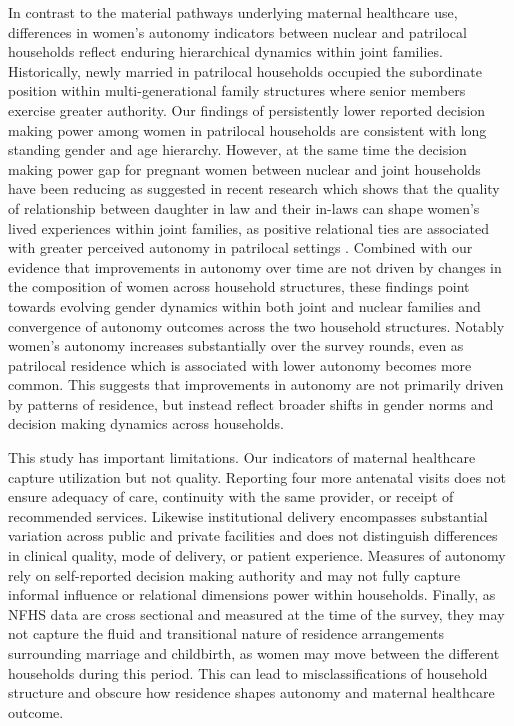 \documentclass[12pt]{article}
\begin{document}
In contrast to the material pathways underlying maternal healthcare use, differences in women’s autonomy indicators between nuclear and patrilocal households reflect enduring hierarchical dynamics within joint families. Historically, newly married in patrilocal households occupied the subordinate position within multi-generational family structures where senior members exercise greater authority. Our findings of persistently lower reported decision making power among women in patrilocal households are consistent with long standing gender and age hierarchy. However, at the same time the decision making power gap for pregnant women between nuclear and joint households have been reducing as suggested in recent research which shows  that the quality of relationship between daughter in law and their in-laws can shape women’s lived experiences within joint families, as positive relational ties are associated with greater perceived autonomy in patrilocal settings \cite{char2010influence}. Combined with our evidence that improvements in autonomy over time are not driven by changes in the composition of women across household structures, these findings point towards evolving gender dynamics within both joint and nuclear families and convergence of autonomy outcomes across the two household structures. Notably women's autonomy increases substantially over the survey rounds, even as patrilocal residence which is associated with lower autonomy  becomes more common. This suggests that improvements in autonomy are not primarily driven by patterns of residence, but instead reflect broader shifts in gender norms and decision making dynamics across households.

This study has important limitations. Our indicators of maternal healthcare capture utilization but not quality. Reporting four more antenatal visits does not ensure adequacy of care, continuity with the same provider, or receipt of recommended services. Likewise institutional delivery encompasses substantial variation across public and private facilities and does not distinguish differences in clinical quality, mode of delivery, or patient  experience. Measures of autonomy rely on self-reported decision making authority and may not fully capture informal influence or relational dimensions power within households.  Finally, as NFHS data are cross sectional and measured at the time of the survey, they may not capture the fluid and transitional nature of residence arrangements surrounding marriage and childbirth, as women may move between the different households during this period. This can lead to misclassifications of household structure and obscure how residence shapes autonomy and maternal healthcare outcome.
\end{document}
